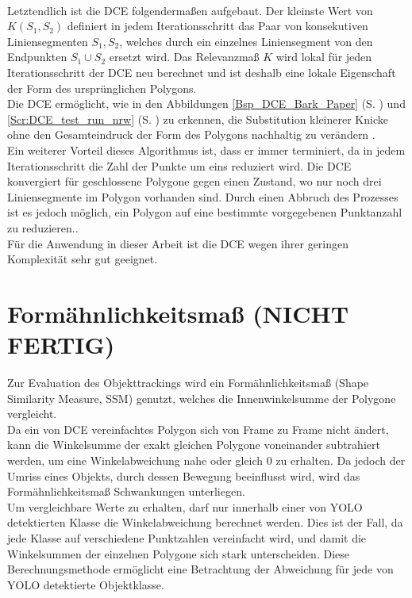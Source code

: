 { \\ 
 Letztendlich ist die DCE folgendermaßen aufgebaut. Der kleinste Wert von $K(S_1,S_2)$ definiert in jedem Iterationsschritt das Paar von konsekutiven Liniensegmenten $S_1, S_2$, welches durch ein einzelnes Liniensegment von den Endpunkten $S_1 \cup S_2$ ersetzt wird. Das Relevanzmaß $K$ wird lokal für jeden Iterationsschritt der DCE neu berechnet und ist deshalb eine lokale Eigenschaft der Form des ursprünglichen Polygons. \\ Die DCE ermöglicht, wie in den Abbildungen \ref{Bsp_DCE_Bark_Paper} (S. \pageref{Bsp_DCE_Bark_Paper}) und \ref{Scr:DCE_test_run_nrw} (S. \pageref{Scr:DCE_test_run_nrw}) zu erkennen, die Substitution kleinerer Knicke ohne den Gesamteindruck der Form des Polygons nachhaltig zu verändern \citep{Barkowsky2000}.
 \\
 Ein weiterer Vorteil dieses Algorithmus ist, dass er immer terminiert, da in jedem Iterationsschritt die Zahl der Punkte um eins reduziert wird. Die DCE konvergiert für geschlossene Polygone gegen einen Zustand, wo nur noch drei Liniensegmente im Polygon vorhanden sind. Durch einen Abbruch des Prozesses ist es jedoch möglich, ein Polygon auf eine bestimmte vorgegebenen Punktanzahl zu reduzieren.\citep{Barkowsky2000}. \\ 
Für die Anwendung in dieser Arbeit ist die DCE wegen ihrer geringen Komplexität sehr gut geeignet.
}

\section{Formähnlichkeitsmaß (NICHT FERTIG)}{
	Zur Evaluation des Objekttrackings wird ein Formähnlichkeitsmaß (\glqq Shape Similarity Measure\grqq{}, SSM) genutzt, welches die Innenwinkelsumme der Polygone vergleicht. \\
	Da ein von DCE vereinfachtes Polygon sich von Frame zu Frame nicht ändert, kann die Winkelsumme der exakt gleichen Polygone voneinander subtrahiert werden, um eine Winkelabweichung nahe oder gleich 0 zu erhalten. Da jedoch der Umriss eines Objekts, durch dessen Bewegung beeinflusst wird, wird das Formähnlichkeitsmaß Schwankungen unterliegen.\\
	Um vergleichbare Werte zu erhalten, darf nur innerhalb einer von YOLO detektierten Klasse die Winkelabweichung berechnet werden. Dies ist der Fall, da jede Klasse auf verschiedene Punktzahlen vereinfacht wird, und damit die Winkelsummen der einzelnen Polygone sich stark unterscheiden. Diese Berechnungsmethode ermöglicht eine Betrachtung der Abweichung für jede von YOLO detektierte Objektklasse.  	
}

